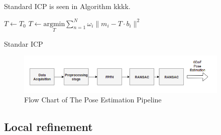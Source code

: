 Standard ICP is seen in Algorithm kkkk.

\begin{algorithm}[H]
\SetAlgoLined
{}
 $T \leftarrow T_{0}$  \;
 {
   $T \leftarrow \underset{T}{\mathrm{argmin}} {\sum \limits_{n=1}^{N}\omega _{i}\|m_{i}-T \cdot b_{i}\|^{2}}$\;
}
\caption{Standar ICP}
\label{alg:algICP}
\end{algorithm}

\begin{figure}[!h]
\begin{center}
\includegraphics[width=4in]{diagrams/endpipeline.png}
\caption{Flow Chart of The Pose Estimation Pipeline}
\label{fig:icp}
\end{center}
\end{figure}
\subsection{Local refinement}




































